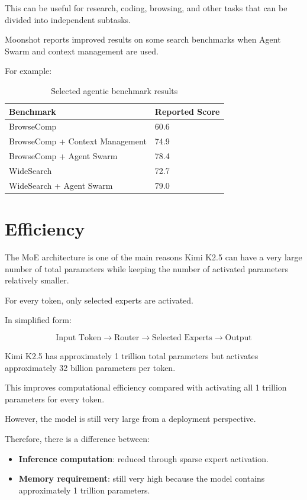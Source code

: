 \documentclass{article}
\begin{document}
This can be useful for research, coding, browsing, and other tasks that can be divided into independent subtasks.

Moonshot reports improved results on some search benchmarks when Agent Swarm and context management are used.

For example:

\begin{table}[h]
\centering
\begin{tabular}{ll}
\hline
Benchmark & Reported Score \\
\hline
BrowseComp & 60.6 \\
BrowseComp + Context Management & 74.9 \\
BrowseComp + Agent Swarm & 78.4 \\
WideSearch & 72.7 \\
WideSearch + Agent Swarm & 79.0 \\
\hline
\end{tabular}
\caption{Selected agentic benchmark results}
\end{table}

\section{Efficiency}

The MoE architecture is one of the main reasons Kimi K2.5 can have a very large number of total parameters while keeping the number of activated parameters relatively smaller.

For every token, only selected experts are activated.

In simplified form:

\[
\text{Input Token}
\rightarrow
\text{Router}
\rightarrow
\text{Selected Experts}
\rightarrow
\text{Output}
\]

Kimi K2.5 has approximately 1 trillion total parameters but activates approximately 32 billion parameters per token.

This improves computational efficiency compared with activating all 1 trillion parameters for every token.

However, the model is still very large from a deployment perspective.

Therefore, there is a difference between:

\begin{itemize}
\item \textbf{Inference computation}: reduced through sparse expert activation.
\item \textbf{Memory requirement}: still very high because the model contains approximately 1 trillion parameters.
\end{itemize}
\end{document}
